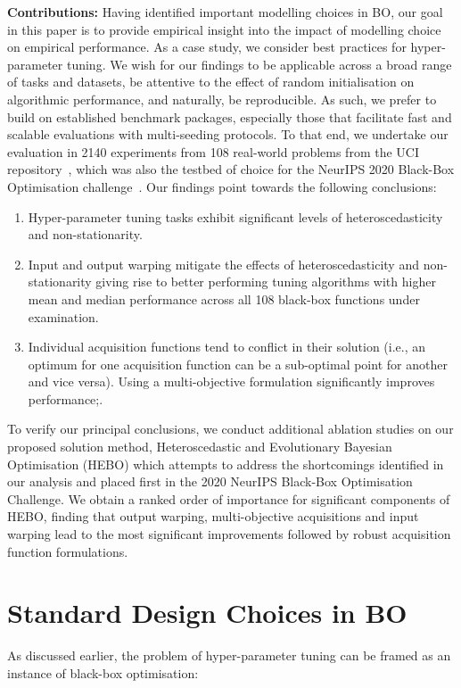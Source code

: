 \documentclass[jair,twoside,11pt,theapa]{article}
\let\cite\shortcite
\theoremstyle{definition}
\begin{document}
\noindent \textbf{Contributions:} Having identified important modelling choices in BO, our goal in this paper is to provide empirical insight into the impact of modelling choice on empirical performance. As a case study, we consider best practices for hyper-parameter tuning. We wish for our findings to be applicable across a broad range of tasks and datasets, be attentive to the effect of random initialisation on algorithmic performance, and naturally, be reproducible. As such, we prefer to build on established benchmark packages, especially those that facilitate fast and scalable evaluations with multi-seeding protocols. To that end, we undertake our evaluation in 2140 experiments from 108 real-world problems from the UCI repository~\cite{2019_Dua}, which was also the testbed of choice for the NeurIPS 2020 Black-Box Optimisation challenge~\cite{2021_Turner}. Our findings point towards the following conclusions: 
\begin{enumerate}
\item Hyper-parameter tuning tasks exhibit significant levels of heteroscedasticity and non-stationarity.
\item Input and output warping mitigate the effects of heteroscedasticity and non-stationarity giving rise to better performing tuning algorithms with higher mean and median performance across all 108 black-box functions under examination. 
\item Individual acquisition functions tend to conflict in their solution (i.e., an optimum for one acquisition function can be a sub-optimal point for another and vice versa). Using a multi-objective formulation significantly improves performance;.
\end{enumerate}


To verify our principal conclusions, we conduct additional ablation studies on our proposed solution method, Heteroscedastic and Evolutionary Bayesian Optimisation (HEBO) which attempts to address the shortcomings identified in our analysis and placed first in the 2020 NeurIPS Black-Box Optimisation Challenge. We obtain a ranked order of importance for significant components of HEBO, finding that output warping, multi-objective acquisitions and input warping lead to the most significant improvements followed by robust acquisition function formulations. 
 
\section{Standard Design Choices in BO}  
As discussed earlier, the problem of hyper-parameter tuning can be framed as an instance of black-box optimisation:
\end{document}
